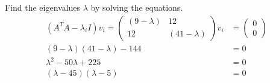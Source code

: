 \documentclass{article}
\begin{document}
Find the eigenvalues $\lambda$ by solving the equations.
\begin{align*}
    (A^T A-\lambda_i I)v_i=\begin{pmatrix}
        (9-\lambda) & 12 \\12 &(41-\lambda)
    \end{pmatrix}v_i & =  \begin{pmatrix}
        0 \\0
    \end{pmatrix}    \\
    (9-\lambda)(41-\lambda)-144                          & =                           0    \\
    \lambda^2 -50\lambda+225                             & =                              0 \\
    (\lambda-45)(\lambda-5)                              & =0
\end{align*}
\end{document}
